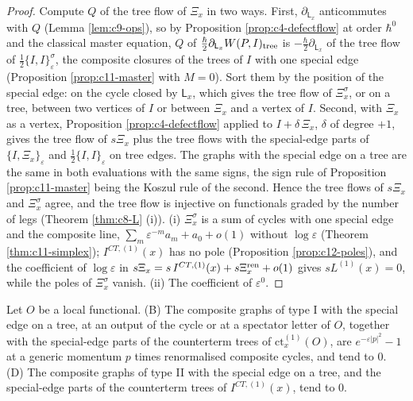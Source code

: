 \begin{proof}
Compute $Q$ of the tree flow of $\Xi_x$ in two ways. First, $\partial_{\mathsf L_x}$ anticommutes with $Q$ (Lemma \ref{lem:c9-ops}), so by Proposition \ref{prop:c4-defectflow} at order $\hbar^0$ and the classical master equation, $Q$ of $\tfrac\hbar2\partial_{\mathsf L_x}W(P,I)_{\rm tree}$ is $-\tfrac\hbar2\partial_{\mathsf L_x}$ of the tree flow of $\tfrac12\{I,I\}^\sigma_\varepsilon$, the composite closures of the trees of $I$ with one special edge (Proposition \ref{prop:c11-master} with $M=0$). Sort them by the position of the special edge: on the cycle closed by $\mathsf L_x$, which gives the tree flow of $\Xi^\sigma_x$, or on a tree, between two vertices of $I$ or between $\Xi_x$ and a vertex of $I$. Second, with $\Xi_x$ as a vertex, Proposition \ref{prop:c4-defectflow} applied to $I+\delta\,\Xi_x$, $\delta$ of degree $+1$, gives the tree flow of $s\Xi_x$ plus the tree flows with the special-edge parts of $\{I,\Xi_x\}_\varepsilon$ and $\tfrac12\{I,I\}_\varepsilon$ on tree edges. The graphs with the special edge on a tree are the same in both evaluations with the same signs, the sign rule of Proposition \ref{prop:c11-master} being the Koszul rule of the second. Hence the tree flows of $s\Xi_x$ and $\Xi^\sigma_x$ agree, and the tree flow is injective on functionals graded by the number of legs (Theorem \ref{thm:c8-L} (i)). (i) $\Xi^\sigma_x$ is a sum of cycles with one special edge and the composite line, $\sum_m\varepsilon^{-m}a_m+a_0+o(1)$ without $\log\varepsilon$ (Theorem \ref{thm:c11-simplex}); $I^{CT,(1)}(x)$ has no pole (Proposition \ref{prop:c12-poles}), and the coefficient of $\log\varepsilon$ in $s\Xi_x=s\,I^{CT,(1)}(x)+s\Xi^{\rm ren}_x+o(1)$ gives $sL^{(1)}(x)=0$, while the poles of $\Xi^\sigma_x$ vanish. (ii) The coefficient of $\varepsilon^0$.
\end{proof}

\begin{lemma}
\label{lem:c12-BD}
Let $O$ be a local functional. (B) The composite graphs of type I with the special edge on a tree, at an output of the cycle or at a spectator letter of $O$, together with the special-edge parts of the counterterm trees of $\mathrm{ct}^{(1)}_x(O)$, are $e^{-\varepsilon|p|^2}-1$ at a generic momentum $p$ times renormalised composite cycles, and tend to $0$. (D) The composite graphs of type II with the special edge on a tree, and the special-edge parts of the counterterm trees of $I^{CT,(1)}(x)$, tend to $0$.
\end{lemma}

